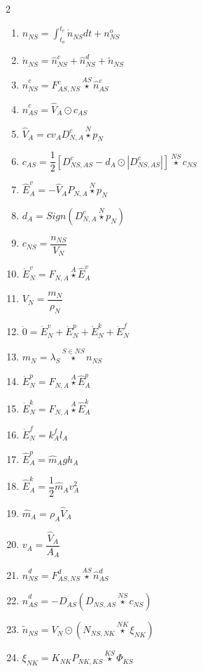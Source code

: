 \documentclass[10pt,a4paper]{report}
\begin{document}
	\begin{multicols}{2}
	\begin{enumerate}
		\item $n_{NS} = \int_{t_o}^{t_e} \dot{n}_{NS} dt + n^{o}_{NS}$
		\item $\dot{n}_{NS} = \hat{n}^{c}_{NS} + \hat{n}^{d}_{NS} + \tilde{n}_{NS}$
		\item $\hat{n}^{c}_{NS} = F^{c}_{AS,NS} \overset{AS}{\star} \hat{n}^{c}_{AS}$
		\item $\hat{n}^{c}_{AS} = \hat{V}_{A} \odot c_{AS}$
		\item $\hat{V}_{A} = cv_A D^{c}_{N,A} \overset{N}{\star} p_N$
		\item $c_{AS} = \dfrac{1}{2} \left[ D^{c}_{NS,AS} - d_A \odot \left|D^{c}_{NS,AS} \right|  \right] \overset{NS}{\star} c_{NS}$
		\item $\hat{E}^{v}_{A} = -\hat{V}_{A} P_{N,A} \overset{N}{\star} p_N$
		\item $d_A = Sign(D^{c}_{N,A} \overset{N}{\star} p_N)$
		\item $c_{NS} = \dfrac{n_{NS}}{V_N}$
		\item $\dot{E}^{v}_N = F_{N,A} \overset{A}{\star} \hat{E}^{v}_{A}$
		\item $V_N = \dfrac{m_N}{\rho_N}$
		\item $\dot{0} = \dot{E}^{v}_N + \dot{E}^{p}_N + \dot{E}^{k}_N + \dot{E}^{f}_N$
		\item $m_N = \lambda_S \overset{S \in NS}{\star} n_{NS}$
		\item $\dot{E}^{p}_N = F_{N,A} \overset{A}{\star} \hat{E}^{p}_{A}$
		\item $\dot{E}^{k}_N = F_{N,A} \overset{A}{\star} \hat{E}^{k}_{A}$
		\item $\dot{E}^{f}_N = k^{f}_A l_A$
		\item $\hat{E}^{p}_{A} = \hat{m}_A g h_A$
		\item $\hat{E}^{k}_{A} = \dfrac{1}{2} \hat{m}_A v_A^2$
		\item $\hat{m}_A = \rho_A \hat{V}_{A}$
		\item $v_A = \dfrac{\hat{V}_{A}}{A_A} $
		\item $\hat{n}^{d}_{NS} = F^{d}_{AS,NS} \overset{AS}{\star} \hat{n}^{d}_{AS}$
		\item $\hat{n}^{d}_{AS} = -D_{AS} \left( D_{NS,AS} \overset{NS}{\star} c_{NS} \right) $
		\item $\tilde{n}_{NS} = V_N \odot \left( N_{NS, NK} \overset{NK}{\star} \xi_{NK} \right) $
		\item $\xi_{NK} = K_{NK} P_{NK, KS} \overset{KS}{\star} \Phi_{KS}$

\end{enumerate}
\end{multicols}
\end{document}
